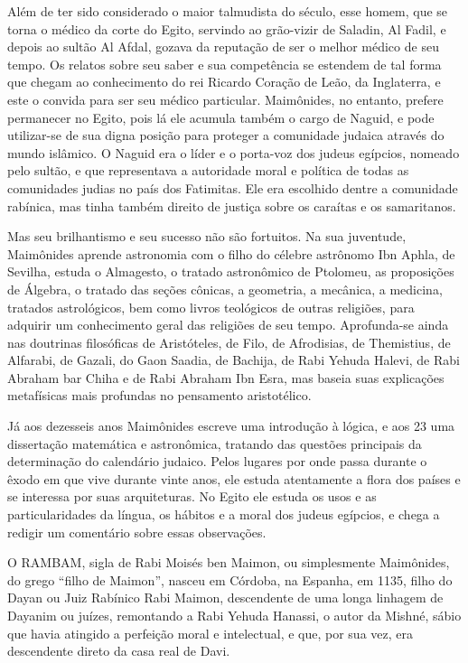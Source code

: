 Além de ter sido considerado o maior talmudista do século, esse homem,
que se torna o médico da corte do Egito, servindo ao grão-vizir de
Saladin, Al Fadil, e depois ao sultão Al Afdal, gozava da reputação de
ser o melhor médico de seu tempo. Os relatos sobre seu saber e sua
competência se estendem de tal forma que chegam ao conhecimento do rei
Ricardo Coração de Leão, da Inglaterra, e este o convida para ser seu
médico particular. Maimônides, no entanto, prefere permanecer no Egito,
pois lá ele acumula também o cargo de Naguid, e pode utilizar-se de sua
digna posição para proteger a comunidade judaica através do mundo
islâmico. O Naguid era o líder e o porta-voz dos judeus egípcios,
nomeado pelo sultão, e que representava a autoridade moral e política
de todas as comunidades judias no país dos Fatimitas. Ele era escolhido
dentre a comunidade rabínica, mas tinha também direito de justiça sobre
os caraítas e os samaritanos.

Mas seu brilhantismo e seu sucesso não são fortuitos. Na sua juventude,
Maimônides aprende astronomia com o filho do célebre astrônomo Ibn
Aphla, de Sevilha, estuda o Almagesto, o tratado astronômico de
Ptolomeu, as proposições de Álgebra, o tratado das seções cônicas, a
geometria, a mecânica, a medicina, tratados astrológicos, bem como
livros teológicos de outras religiões, para adquirir um conhecimento
geral das religiões de seu tempo. Aprofunda-se ainda nas doutrinas
filosóficas de Aristóteles, de Filo, de Afrodisias, de Themistius, de
Alfarabi, de Gazali, do Gaon Saadia, de Bachija, de Rabi Yehuda Halevi,
de Rabi Abraham bar Chiha e de Rabi Abraham Ibn Esra, mas baseia suas
explicações metafísicas mais profundas no pensamento aristotélico.

Já aos dezesseis anos Maimônides escreve uma introdução à lógica, e aos
23 uma dissertação matemática e astronômica, tratando das questões
principais da determinação do calendário judaico. Pelos lugares por onde
passa durante o êxodo em que vive durante vinte anos, ele estuda
atentamente a flora dos países e se interessa por suas arquiteturas. No
Egito ele estuda os usos e as particularidades da língua, os hábitos e
a moral dos judeus egípcios, e chega a redigir um comentário sobre essas
observações.

O RAMBAM, sigla de Rabi Moisés ben Maimon, ou simplesmente Maimônides,
do grego ``filho de Maimon'', nasceu em Córdoba, na Espanha, em 1135,
filho do Dayan ou Juiz Rabínico Rabi Maimon, descendente de uma longa linhagem de Dayanim ou juízes, remontando a Rabi Yehuda Hanassi, o
autor da Mishné, sábio que havia atingido a perfeição moral e
intelectual, e que, por sua vez, era descendente direto da casa real de
Davi.

